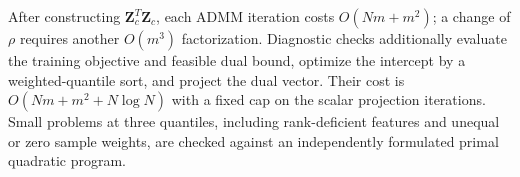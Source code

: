 {\color{blue}After constructing $\boldsymbol{Z}_c^T\boldsymbol{Z}_c$, each ADMM iteration costs $O(Nm+m^2)$; a change of $\rho$ requires another $O(m^3)$ factorization. Diagnostic checks additionally evaluate the training objective and feasible dual bound, optimize the intercept by a weighted-quantile sort, and project the dual vector. Their cost is $O(Nm+m^2+N\log N)$ with a fixed cap on the scalar projection iterations. Small problems at three quantiles, including rank-deficient features and unequal or zero sample weights, are checked against an independently formulated primal quadratic program.}
